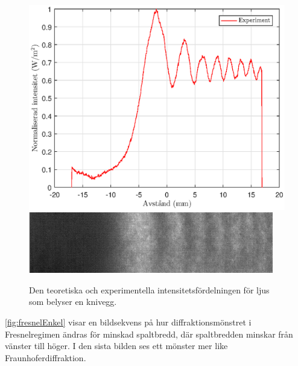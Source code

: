 \documentclass[a4paper]{article}
\begin{document}
\begin{figure}[h!]
	\centering
	\includegraphics[width=0.75\linewidth]{Data/Figurer/edge.eps}
	\includegraphics[width=0.5\linewidth]{Data/Figurer/edge.png}
	\caption{Den teoretiska och experimentella intensitetsfördelningen för ljus som belyser en knivegg.}
	\label{fig:edge}
\end{figure}

\FloatBarrier

\autoref{fig:fresnelEnkel} visar en bildsekvens på hur diffraktionsmönstret i Fresnelregimen ändras för minskad spaltbredd, där spaltbredden minskar från vänster till höger. I den sista bilden ses ett mönster mer like Fraunhoferdiffraktion.

\FloatBarrier
\end{document}
